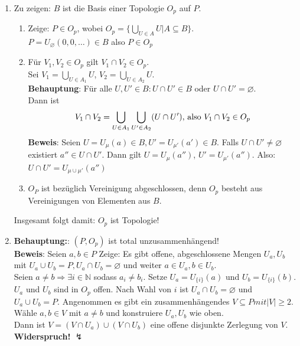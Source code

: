 \begin{solution}
  \
  \begin{enumerate}
    \item Zu zeigen: \( B \) ist die Basis einer Topologie \( O_p \) auf \( P \).
    \begin{enumerate}
      \item Zeige: \( P \in O_p \), wobei \( O_p = \{ \bigcup_{U \in A} U | A \subseteq B \} \). \\
      \( P = U_{\varnothing} (0,0, \dots) \in B \) also \( P \in O_p \) 
      \item Für \( V_1,V_2 \in O_p \) gilt \( V_1 \cap V_2 \in O_p \). \\
      Sei \( V_1 = \bigcup_{U \in A_1} U \), \( V_2 = \bigcup_{U \in A_2} U \). \\
      \textbf{Behauptung}: Für alle \( U,U' \in B: U \cap U' \in B \) oder \( U \cap U' = \varnothing \). \\
      Dann ist 
      \begin{equation*}
        V_1 \cap V_2 = \bigcup_{U \in A_1} \bigcup_{U' \in A_2} (U \cap U')\text{, also } V_1 \cap V_2 \in O_p \\
      \end{equation*}
      \textbf{Beweis}: Seien \( U = U_{\mu} (a) \in B , U' = U_{\mu'} (a') \in B \). Falls \( U \cap U' \neq \varnothing \) existiert \( a'' \in U \cap U' \). Dann gilt \( U = U_{\mu}(a'') \), \( U' = U_{\mu'}(a'') \). Also: \\
      \( U \cap U' = U_{\mu \cup \mu'} (a'') \) 
      \item \( O_P \) ist bezüglich Vereinigung abgeschlossen, denn \( O_p \) besteht aus Vereinigungen von Elementen aus \( B \). \\
    \end{enumerate}
    Insgesamt folgt damit: \( O_p \) ist Topologie! 
    
    \item \textbf{Behauptung:}: \( (P, O_p) \) ist total unzusammenhängend! \\
    \textbf{Beweis}: Seien \( a,b \in P \) Zeige: Es gibt offene, abgeschlossene Mengen \( U_a, U_b \) mit \( U_a \cup U_b = P, U_a \cap U_b = \varnothing \) und weiter \( a \in U_a , b \in U_b \). \\
    Seien \( a \neq b \Rightarrow \exists i \in \mathbb{N} \) sodass \( a_i \neq b_i \). Setze \( U_a = U_{\{ i \}}(a) \) und \( U_b = U_{\{ i \}}(b) \). \\
    \( U_a \) und \( U_b \) sind in \( O_p \) offen. Nach Wahl von \( i \) ist \( U_a \cap U_b = \varnothing \) und \( U_a \cup U_b = P \). Angenommen es gibt ein zusammenhängendes \( V \subseteq P mit \vert V \vert \geq 2 \). \\
    Wähle \( a, b \in V \) mit \( a \neq b \) und konstruiere \( U_a, U_b \) wie oben. \\
    Dann ist \( V = (V \cap U_a) \cup (V \cap U_b) \) eine offene disjunkte Zerlegung von \( V \). \\
    \textbf{Widerspruch!} \( \lightning \) 
  \end{enumerate}
\end{solution}

